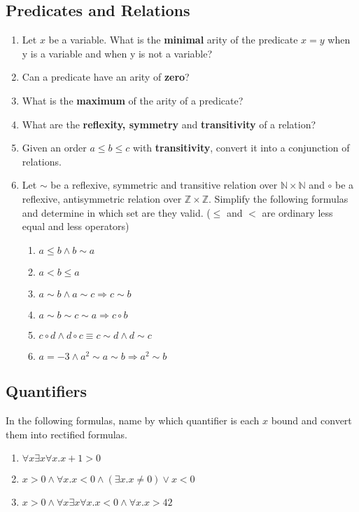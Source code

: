 \documentclass[12pt]{article}
\begin{document}
\subsection*{Predicates and Relations}
\begin{enumerate}
    \item Let $x$ be a variable. What is the \textbf{minimal} arity of the predicate $x = y$ when y is a variable and when 
    y is not a variable?
    \item Can a predicate have an arity of \textbf{zero}? 
    \item What is the \textbf{maximum} of the arity of a predicate?
    \item What are the \textbf{reflexity, symmetry} and \textbf{transitivity} of a relation?
    \item Given an order $a \leq b \leq c$ with \textbf{transitivity}, convert it into a conjunction of relations.
    \item Let $\sim$ be a reflexive, symmetric and transitive relation over $\mathbb{N} \times \mathbb{N}$ and 
    $\circ$ be a reflexive, antisymmetric relation over $\mathbb{Z} \times \mathbb{Z}$. Simplify the 
    following formulas and determine in which set are they valid. ($\leq$ and $<$ are ordinary less equal and less 
    operators)
    \begin{enumerate}
        \item $a \leq b \land b \sim a$
        \item $a < b \leq a$
        \item $a \sim b \land a \sim c \Longrightarrow c \sim b$
        \item $a \sim b \sim c \sim a \Longrightarrow c \circ b$
        \item $c \circ d \land d \circ c \equiv c \sim d \land d \sim c$
        \item $a = -3 \land a^2 \sim a \sim b \Longrightarrow a^2 \sim b$
    \end{enumerate}
\end{enumerate}
\subsection*{Quantifiers}
In the following formulas, name by which quantifier is each $x$ bound and convert them into rectified formulas.
\begin{enumerate}
    \item $\forall x \exists x \forall x. x + 1 > 0$
    \item $x > 0 \land \forall x. x < 0 \land (\exists x. x \not=0) \lor x < 0$
    \item $x > 0 \land \forall x \exists x \forall x. x < 0 \land \forall x. x > 42$
\end{enumerate}
\end{document}
